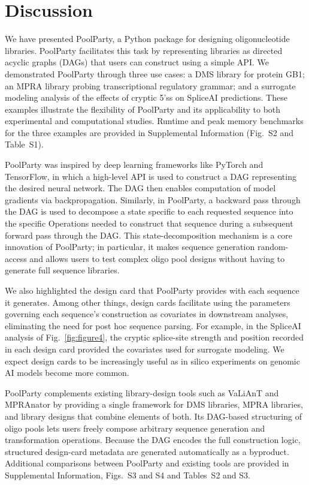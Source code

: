 \documentclass[pdflatex,sn-vancouver-num,referee,oneside]{sn-jnl}
\begin{document}
\section*{Discussion}\label{sec:discussion}

We have presented PoolParty, a Python package for designing oligonucleotide libraries. PoolParty facilitates this task by representing libraries as directed acyclic graphs (DAGs) that users can construct using a simple API. We demonstrated PoolParty through three use cases: a DMS library for protein GB1; an MPRA library probing transcriptional regulatory grammar; and a surrogate modeling analysis of the effects of cryptic 5'ss on SpliceAI predictions. These examples illustrate the flexibility of PoolParty and its applicability to both experimental and computational studies. Runtime and peak memory benchmarks for the three examples are provided in Supplemental Information (Fig.~S2 and Table~S1).

PoolParty was inspired by deep learning frameworks like PyTorch and TensorFlow, in which a high-level API is used to construct a DAG representing the desired neural network. The DAG then enables computation of model gradients via backpropagation. Similarly, in PoolParty, a backward pass through the DAG is used to decompose a state specific to each requested sequence into the specific Operations needed to construct that sequence during a subsequent forward pass through the DAG. This state-decomposition mechanism is a core innovation of PoolParty; in particular, it makes sequence generation random-access and allows users to test complex oligo pool designs without having to generate full sequence libraries.

We also highlighted the design card that PoolParty provides with each sequence it generates. Among other things, design cards facilitate using the parameters governing each sequence's construction as covariates in downstream analyses, eliminating the need for post hoc sequence parsing. For example, in the SpliceAI analysis of Fig.~\ref{fig:figure4}, the cryptic splice-site strength and position recorded in each design card provided the covariates used for surrogate modeling. We expect design cards to be increasingly useful as in silico experiments on genomic AI models become more common.

PoolParty complements existing library-design tools such as VaLiAnT \citep{Barbon2022th} and MPRAnator \citep{GeorgakopoulosSoares2017gb} by providing a single framework for DMS libraries, MPRA libraries, and library designs that combine elements of both. Its DAG-based structuring of oligo pools lets users freely compose arbitrary sequence generation and transformation operations. Because the DAG encodes the full construction logic, structured design-card metadata are generated automatically as a byproduct. Additional comparisons between PoolParty and existing tools are provided in Supplemental Information, Figs.~S3 and S4 and Tables~S2 and S3.
\end{document}
